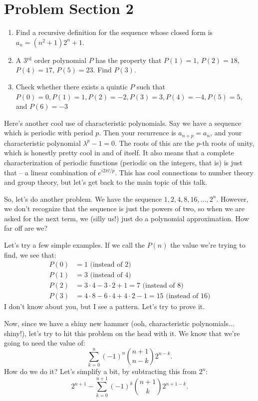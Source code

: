 \documentclass[12pt,letterpaper]{article}
\begin{document}
\section{Problem Section 2}
\begin{enumerate}
  \item Find a recursive definition for the sequence whose closed form is $a_n =
  (n^2 + 1) 2^n + 1$.
  \item A 3$^{\text{rd}}$ order polynomial $P$ has the property that $P(1) = 1$, $P(2) = 18$,
  $P(4) = 17$, $P(5) = 23$. Find $P(3)$.
  \item Check whether there exists a quintic $P$ such that $P(0) = 0, P(1) = 1, P(2) = -2,
  P(3) = 3, P(4) = -4, P(5) = 5$, and $P(6)=-3$
\end{enumerate}

Here's another cool use of characteristic polynomials. Say we have a
sequence which is periodic with period $p$. Then your recurrence is
$a_{n+p} = a_n$, and your characteristic polynomial $\lambda^p-1=0$.
The roots of this are the $p$-th roots of unity, which is honestly
pretty cool in and of itself. It also means that a complete
characterization of periodic functions (periodic on the integers, that
is) is just that -- a linear combination of $e^{i2\pi l/p}$. This has
cool connections to number theory and group theory, but let's get back
to the main topic of this talk.

So, let's do another problem. We have the sequence $1, 2, 4, 8, 16, \ldots, 2^n$. However,
we don't recognize that the sequence is just the powers of two, so when we are
asked for the next term, we (silly us!) just do a polynomial approximation. How
far off are we?

Let's try a few simple examples. If we call the $P(n)$ the value we're trying to find, we
see that:
\begin{eqnarray*}
P(0) &= 1 \text{ (instead of 2)}\\
P(1) &= 3 \text{ (instead of 4)}\\
P(2) &= 3\cdot4-3\cdot2+1 = 7 \text{ (instead of 8)}\\
P(3) &= 4\cdot8-6\cdot4+4\cdot2-1 = 15 \text{ (instead of 16)}
\end{eqnarray*}
I don't know about you, but I see a pattern. Let's try to prove it.

Now, since we have a shiny new hammer (ooh, characteristic polynomials... shiny!), let's try
to hit this problem on the head with it. We know that we're going to need the value of: $$
\sum_{k=0}^{n} (-1)^n \binom{n+1}{n-k} 2^{n-k}.$$ How do we do it? Let's simplify a bit, by
subtracting this from $2^n$: $$2^{n+1} - \sum_{k=0}^{n+1} (-1)^k \binom{n+1}{k} 2^{n+1-k}.$$
\end{document}
